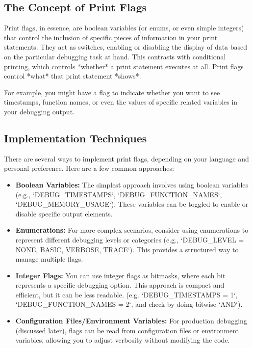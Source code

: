 \documentclass{article}
\begin{document}
{{{\subsection*{The Concept of Print Flags}

Print flags, in essence, are boolean variables (or enums, or even simple integers) that control the inclusion of specific pieces of information in your print statements. They act as switches, enabling or disabling the display of data based on the particular debugging task at hand. This contrasts with conditional printing, which controls *whether* a print statement executes at all. Print flags control *what* that print statement *shows*.

For example, you might have a flag to indicate whether you want to see timestamps, function names, or even the values of specific related variables in your debugging output.

\subsection*{Implementation Techniques}

There are several ways to implement print flags, depending on your language and personal preference. Here are a few common approaches:

\begin{itemize}
    \item \textbf{Boolean Variables:} The simplest approach involves using boolean variables (e.g., `DEBUG_TIMESTAMPS`, `DEBUG_FUNCTION_NAMES`, `DEBUG_MEMORY_USAGE`). These variables can be toggled to enable or disable specific output elements.
    \item \textbf{Enumerations:} For more complex scenarios, consider using enumerations to represent different debugging levels or categories (e.g., `DEBUG_LEVEL = {NONE, BASIC, VERBOSE, TRACE}`). This provides a structured way to manage multiple flags.
    \item \textbf{Integer Flags:} You can use integer flags as bitmasks, where each bit represents a specific debugging option. This approach is compact and efficient, but it can be less readable. (e.g. `DEBUG_TIMESTAMPS = 1`, `DEBUG_FUNCTION_NAMES = 2`, and check by doing bitwise `AND`).
    \item \textbf{Configuration Files/Environment Variables:} For production debugging (discussed later), flags can be read from configuration files or environment variables, allowing you to adjust verbosity without modifying the code.
\end{itemize}

}}}
\end{document}
